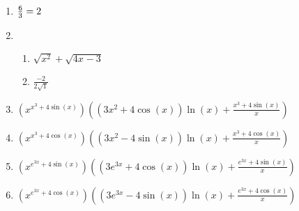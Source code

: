 \documentclass[12pt]{amsart}
\begin{document}
\begin{enumerate}
\item $\frac{6}{3} = 2$
\def \a{1}\def \b{3}\def \ab{3}\def \c{0}\def \amb{-2}\def \ansroot{1}\def \firstroot{x^{2}}\def \secondroot{4x^{}-3}\def \porm{-1}
\item \begin{enumerate}
\item $\sqrt{\firstroot} + \sqrt{\secondroot}$
\item $\frac{\amb}{2\sqrt{\ansroot}}$
\end{enumerate}
\def \varexp{3}\def \newexp{2}\def \trigcoeff{4}\def \trigval{+4}\def \oppval{-4}
\item $(x^{x^\varexp \trigval \sin(x)}) \left( (\varexp x^{\newexp} \trigval \cos(x))\ln(x) + \frac{x^\varexp \trigval \sin(x)}{x} \right)$

\item $(x^{x^\varexp \trigval \cos(x)}) \left( (\varexp x^{\newexp} \oppval \sin(x))\ln(x) + \frac{x^\varexp \trigval \cos(x)}{x} \right)$

\item $(x^{e^{\varexp x} \trigval \sin(x)}) \left( (\varexp e^{\varexp x} \trigval \cos(x))\ln(x) + \frac{e^{\varexp x} \trigval \sin(x)}{x} \right)$

\item $(x^{e^{\varexp x} \trigval \cos(x)}) \left( (\varexp e^{\varexp x} \oppval \sin(x))\ln(x) + \frac{e^{\varexp x} \trigval \cos(x)}{x} \right)$
\end{enumerate} 
\end{document}
